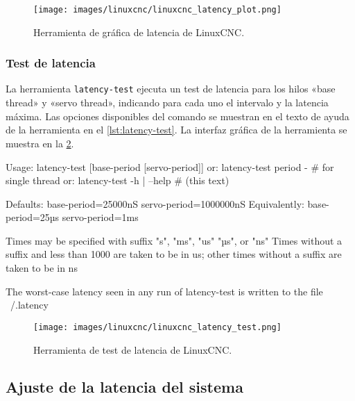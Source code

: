\documentclass[english,spanish,a4paper,11pt]{article}
\begin{document}
\begin{figure}[!ht]
    \centering
    \texttt{[image: images/linuxcnc/linuxcnc\_latency\_plot.png]}
    \caption{Herramienta de gráfica de latencia de LinuxCNC.}
    \label{fig:linuxcnc_latency_plot}
\end{figure}


\subsubsection{Test de latencia}

La herramienta \texttt{latency-test} ejecuta un test de latencia para los hilos «base thread» y «servo thread», indicando para cada uno el intervalo y la latencia máxima. Las opciones disponibles del comando se muestran en el texto de ayuda de la herramienta en el \cref{lst:latency-test}. La interfaz gráfica de la herramienta se muestra en la \cref{fig:linuxcnc_latency_test}.

\begin{listingtitledbox}[
    title=Texto de ayuda de la herramienta \texttt{latency-test}.,
    label=lst:latency-test,
][
    basicstyle=\ttfamily\footnotesize,
    literate={µ}{{\textmu}}1,
]
Usage:
       latency-test [base-period [servo-period]]
   or:
       latency-test period -      # for single thread
   or:
       latency-test -h | --help   # (this text)

Defaults:     base-period=25000nS servo-period=1000000nS
Equivalently: base-period=25µs servo-period=1ms

Times may be specified with suffix "s", "ms", "us" "µs", or "ns"
Times without a suffix and less than 1000 are taken to be in us;
other times without a suffix are taken to be in ns

The worst-case latency seen in any run of latency-test
is written to the file ~/.latency
\end{listingtitledbox}

\begin{figure}[!ht]
    \centering
    \texttt{[image: images/linuxcnc/linuxcnc\_latency\_test.png]}
    \caption{Herramienta de test de latencia de LinuxCNC.}
    \label{fig:linuxcnc_latency_test}
\end{figure}


\subsection{Ajuste de la latencia del sistema}
\end{document}
